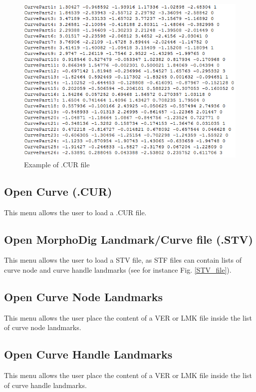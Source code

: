 \begin{figure}[t] 
  \centering
  \includegraphics[scale=0.5]{images/07/curves/CUR_file.png} 
	\caption{Example of .CUR file}
 
\end{figure}

\subsection{Open Curve (.CUR)}
This menu allows the user to load a .CUR file.
\subsection{Open MorphoDig Landmark/Curve file (.STV)}
This menu allows the user to load a STV file, as STF files can contain lists of curve node and curve handle landmarks (see for instance Fig. \ref{STV_file}).
\subsection{Open Curve Node Landmarks}
This menu allows the user place the content of a VER or LMK file inside the list of curve node landmarks.
\subsection{Open Curve Handle Landmarks}
This menu allows the user place the content of a VER or LMK file inside the list of curve handle landmarks.
